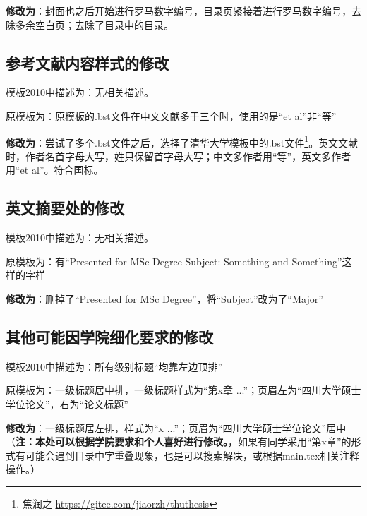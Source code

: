 \textbf{修改为}：封面也之后开始进行罗马数字编号，目录页紧接着进行罗马数字编号，去除多余空白页；去除了目录中的目录。

\subsection{参考文献内容样式的修改}
模板2010中描述为：无相关描述。

原模板为：原模板的.bst文件在中文文献多于三个时，使用的是“et al”非“等”

\textbf{修改为}：尝试了多个.bst文件之后，选择了清华大学模板中\cite{jiaogitlatex}的.bst文件\footnote{焦润之 \url{https://gitee.com/jiaorzh/thuthesis}}。英文文献时，作者名首字母大写，姓只保留首字母大写；中文多作者用“等”，英文多作者用“et al”。符合国标。

\subsection{英文摘要处的修改}
模板2010中描述为：无相关描述。

原模板为：有“Presented for MSc Degree \quad Subject: Something and Something”这样的字样

\textbf{修改为}：删掉了“Presented for MSc Degree”，将“Subject”改为了“Major”

\subsection{其他可能因学院细化要求的修改}
模板2010中描述为：所有级别标题“均靠左边顶排”

原模板为：一级标题居中排，一级标题样式为“第x章 ...”；页眉左为“四川大学硕士学位论文”，右为“论文标题”

\textbf{修改为}：一级标题居左排，样式为“x ...”；页眉为“四川大学硕士学位论文”居中（\textbf{注：本处可以根据学院要求和个人喜好进行修改。}，如果有同学采用“第x章”的形式有可能会遇到目录中字重叠现象，也是可以搜索解决，或根据main.tex相关注释操作。）